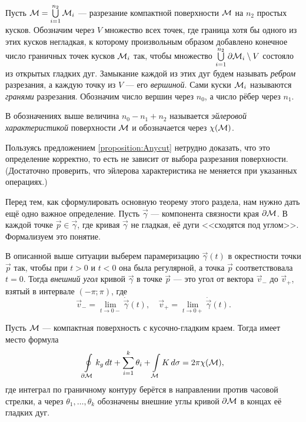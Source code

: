 Пусть $\mathcal{M} = \bigcup\limits_{i = 1}^{n_2}\mathcal{M}_i$ --- разрезание компактной поверхности $\mathcal{M}$ на $n_2$ простых кусков. Обозначим через $V$ множество всех точек, где граница хотя бы одного из этих кусков негладкая, к которому произвольным образом добавлено конечное число граничных точек кусков $\mathcal{M}_i$ так, чтобы множество $\bigcup\limits_{i = 1}^{n_2}\partial\mathcal{M}_i \setminus V$ состояло из открытых гладких дуг. Замыкание каждой из этих дуг будем называть \textit{ребром} разрезания, а каждую точку из $V$ --- его \textit{вершиной}. Сами куски $\mathcal{M}_i$ называются \textit{гранями} разрезания. Обозначим число вершин через $n_0$, а число рёбер через $n_1$.

\begin{definition}
	В обозначениях выше величина $n_0 - n_1 + n_2$ называется \textit{эйлеровой характеристикой} поверхности $\mathcal{M}$ и обозначается через $\chi(\mathcal{M})$.
\end{definition}

Пользуясь предложением \ref{proposition:Anycut} нетрудно доказать, что это определение корректно, то есть не зависит от выбора разрезания поверхности. (Достаточно проверить, что эйлерова характеристика не меняется при указанных операциях.)

Перед тем, как сформулировать основную теорему этого раздела, нам нужно дать ещё одно важное определение. Пусть $\vec{\gamma}$ --- компонента связности края $\partial\mathcal{M}$. В каждой точке $\vec{p} \in \vec{\gamma}$, где кривая $\vec{\gamma}$ не гладкая, её дуги <<сходятся под углом>>. Формализуем это понятие.

\begin{definition}
	В описанной выше ситуации выберем парамеризацию $\vec{\gamma}(t)$ в окрестности точки $\vec{p}$ так, чтобы при $t > 0$ и $t < 0$ она была регулярной, а точка $\vec{p}$ соответствовала $t = 0$. Тогда \textit{внешний угол} кривой $\vec{\gamma}$ в точке $\vec{p}$ --- это угол от вектора $\vec{v}_{-}$ до $\vec{v}_{+}$, взятый в интервале $(-\pi; \pi)$, где
	\[
		\vec{v}_{-} = \lim_{t \to 0-}\dot{\vec{\gamma}}(t),\quad
		\vec{v}_{+} = \lim_{t \to 0+}\dot{\vec{\gamma}}(t).
	\]
\end{definition} %

\pagebreak

\begin{theorem}
	Пусть $\mathcal{M}$ --- компактная поверхность с кусочно-гладким краем. Тогда имеет место формула
	\begin{equation} \label{eq:GaussBonnet}
		\oint\limits_{\partial \mathcal{M}}k_g\,dt + \sum_{i = 1}^k\theta_i + \int\limits_{\mathcal{M}}K\,d\sigma = 2\pi\chi(\mathcal{M}),
	\end{equation}
	где интеграл по граничному контуру берётся в направлении против часовой стрелки, а через $\theta_1, \ldots, \theta_k$ обозначены внешние углы кривой $\partial \mathcal{M}$ в концах её гладких дуг.
\end{theorem}


